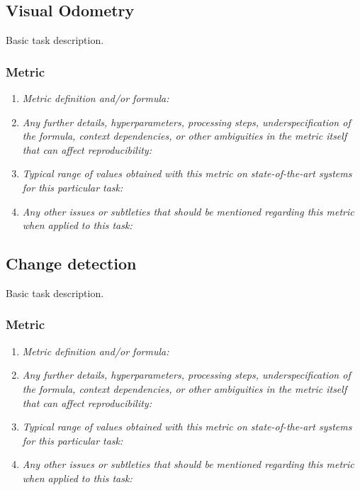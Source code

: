 \documentclass[a4paper,11pt]{article}
\begin{document}
\subsection{Visual Odometry}
    Basic task description.
    \subsubsection{Metric}
        \begin{enumerate}[label=\alph*.]
            \item \textit{Metric definition and/or formula:}
            \bigskip
            \item \textit{Any further details, hyperparameters, processing steps, underspecification of the formula, context dependencies, or other ambiguities in the metric itself that can affect reproducibility:}
            \bigskip
            \item \textit{Typical range of values obtained with this metric on state-of-the-art systems for this particular task:}
            \bigskip
            \item \textit{Any other issues or subtleties that should be mentioned regarding this metric when applied to this task:}
            \bigskip
        \end{enumerate}

\subsection{Change detection}
    Basic task description.
    \subsubsection{Metric}
        \begin{enumerate}[label=\alph*.]
            \item \textit{Metric definition and/or formula:}
            \bigskip
            \item \textit{Any further details, hyperparameters, processing steps, underspecification of the formula, context dependencies, or other ambiguities in the metric itself that can affect reproducibility:}
            \bigskip
            \item \textit{Typical range of values obtained with this metric on state-of-the-art systems for this particular task:}
            \bigskip
            \item \textit{Any other issues or subtleties that should be mentioned regarding this metric when applied to this task:}
            \bigskip
        \end{enumerate}
\end{document}
